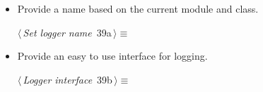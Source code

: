 \documentclass[
    a4paper,      %
    10pt,         %
    openright,    %
    notitlepage,  %
    parskip=half, %
]{scrreprt}       %
\theoremstyle{definition}                    %
\begin{document}
\begin{itemize}
  \item Provide a name based on the current module and class.
    \begin{flushleft} \small
\begin{minipage}{\linewidth}\label{scrap48}\raggedright\small
{} $\langle\,${\itshape Set logger name}\nobreak\ {\footnotesize {39a}}$\,\rangle\equiv$
\vspace{-1exm}
\vspace{-1.5ex}
\footnotesize
{}
\end{minipage}\vspace{4ex}
\end{flushleft}
\item Provide an easy to use interface for logging.
    \begin{flushleft} \small
\begin{minipage}{\linewidth}\label{scrap49}\raggedright\small
{} $\langle\,${\itshape Logger interface}\nobreak\ {\footnotesize {39b}}$\,\rangle\equiv$
\vspace{-1exm}
\vspace{-1.5ex}
\footnotesize
{}
\end{minipage}\vspace{4ex}
\end{flushleft}
\end{itemize}
\end{document}

